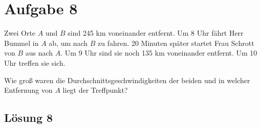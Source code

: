 \section{Aufgabe 8}

Zwei Orte $\displaystyle A$ und $\displaystyle B$ sind 245 km voneinander entfernt. Um 8 Uhr fährt Herr Bummel in $\displaystyle A$ ab, um nach $\displaystyle B$ zu fahren. 20 Minuten später startet Frau Schrott von $\displaystyle B$ aus nach $\displaystyle A$. Um 9 Uhr sind sie noch 135 km voneinander entfernt. Um 10 Uhr treffen sie sich. 

Wie groß waren die Durchschnittsgeschwindigkeiten der beiden und in welcher Entfernung von $\displaystyle A$ liegt der Treffpunkt?

\subsection{Lösung 8}


